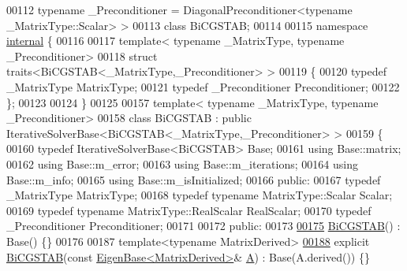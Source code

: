 \begin{DoxyCode}
00112           \textcolor{keyword}{typename} \_Preconditioner = DiagonalPreconditioner<typename \_MatrixType::Scalar> >
00113 \textcolor{keyword}{class }BiCGSTAB;
00114 
00115 \textcolor{keyword}{namespace }\hyperlink{namespaceinternal}{internal} \{
00116 
00117 \textcolor{keyword}{template}< \textcolor{keyword}{typename} \_MatrixType, \textcolor{keyword}{typename} \_Preconditioner>
00118 \textcolor{keyword}{struct }traits<BiCGSTAB<\_MatrixType,\_Preconditioner> >
00119 \{
00120   \textcolor{keyword}{typedef} \_MatrixType MatrixType;
00121   \textcolor{keyword}{typedef} \_Preconditioner Preconditioner;
00122 \};
00123 
00124 \}
00125 
00157 \textcolor{keyword}{template}< \textcolor{keyword}{typename} \_MatrixType, \textcolor{keyword}{typename} \_Preconditioner>
00158 \textcolor{keyword}{class }BiCGSTAB : \textcolor{keyword}{public} IterativeSolverBase<BiCGSTAB<\_MatrixType,\_Preconditioner> >
00159 \{
00160   \textcolor{keyword}{typedef} IterativeSolverBase<BiCGSTAB> Base;
00161   \textcolor{keyword}{using} Base::matrix;
00162   \textcolor{keyword}{using} Base::m\_error;
00163   \textcolor{keyword}{using} Base::m\_iterations;
00164   \textcolor{keyword}{using} Base::m\_info;
00165   \textcolor{keyword}{using} Base::m\_isInitialized;
00166 \textcolor{keyword}{public}:
00167   \textcolor{keyword}{typedef} \_MatrixType MatrixType;
00168   \textcolor{keyword}{typedef} \textcolor{keyword}{typename} MatrixType::Scalar Scalar;
00169   \textcolor{keyword}{typedef} \textcolor{keyword}{typename} MatrixType::RealScalar RealScalar;
00170   \textcolor{keyword}{typedef} \_Preconditioner Preconditioner;
00171 
00172 \textcolor{keyword}{public}:
00173 
\hyperlink{group___iterative_linear_solvers___module_ae1a0df6ef6e947256c3cb83ce7df7eda}{00175}   \hyperlink{group___iterative_linear_solvers___module_ae1a0df6ef6e947256c3cb83ce7df7eda}{BiCGSTAB}() : Base() \{\}
00176 
00187   \textcolor{keyword}{template}<\textcolor{keyword}{typename} MatrixDerived>
\hyperlink{group___iterative_linear_solvers___module_a5842afd9566e254bc727de1fd7f46362}{00188}   \textcolor{keyword}{explicit} \hyperlink{group___iterative_linear_solvers___module_a5842afd9566e254bc727de1fd7f46362}{BiCGSTAB}(\textcolor{keyword}{const} \hyperlink{group___core___module_struct_eigen_1_1_eigen_base}{EigenBase<MatrixDerived>}& 
      \hyperlink{group___core___module_class_eigen_1_1_matrix}{A}) : Base(A.derived()) \{\}

\end{DoxyCode}
